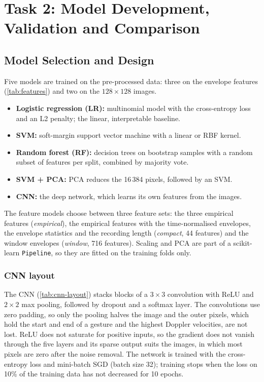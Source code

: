 \documentclass[10pt,a4paper,titlepage]{article}
\begin{document}
\newpage
\section{Task 2: Model Development, Validation and Comparison}
\label{sec:task2}
\subsection{Model Selection and Design}
\label{sec:models}
Five models are trained on the pre-processed data: three on the envelope
features (\autoref{tab:features}) and two on the $128 \times 128$ images.
\begin{itemize}
  \item \textbf{Logistic regression (LR):} multinomial model with the
        cross-entropy loss and an L2 penalty; the linear, interpretable baseline.
  \item \textbf{SVM:} soft-margin support vector machine with a linear or RBF
        kernel.
  \item \textbf{Random forest (RF):} decision trees on bootstrap samples with a
        random subset of features per split, combined by majority vote.
  \item \textbf{SVM + PCA:} PCA reduces the 16\,384 pixels, followed
        by an SVM.
  \item \textbf{CNN:} the deep network, which learns its own features
        from the images.
\end{itemize}
The feature models choose between three feature sets: the three empirical
features (\emph{empirical}), the empirical features with the time-normalised
envelopes, the envelope statistics and the recording length (\emph{compact}, 44
features) and the window envelopes (\emph{window}, 716 features). Scaling and
PCA are part of a scikit-learn \texttt{Pipeline}, so they are fitted on the
training folds only.

\subsubsection{CNN layout}
The CNN (\autoref{tab:cnn-layout}) stacks blocks of a $3 \times 3$ convolution
with ReLU and $2 \times 2$ max pooling, followed by dropout and a softmax layer.
The convolutions use zero padding, so only the pooling halves the image and the
outer pixels, which hold the start and end of a gesture and the highest Doppler
velocities, are not lost. ReLU does not saturate for positive inputs, so the
gradient does not vanish through the five layers and its sparse output suits
the images, in which most pixels are zero after the noise removal. The network
is trained with the cross-entropy loss and mini-batch SGD (batch size 32);
training stops when the loss on 10\% of the training data has not decreased for
10 epochs.
\end{document}
